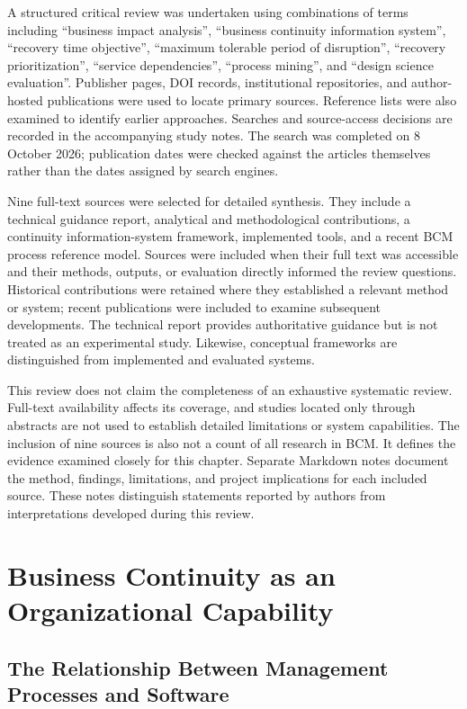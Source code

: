 A structured critical review was undertaken using combinations of terms including ``business impact analysis'', ``business continuity information system'', ``recovery time objective'', ``maximum tolerable period of disruption'', ``recovery prioritization'', ``service dependencies'', ``process mining'', and ``design science evaluation''. Publisher pages, DOI records, institutional repositories, and author-hosted publications were used to locate primary sources. Reference lists were also examined to identify earlier approaches. Searches and source-access decisions are recorded in the accompanying study notes. The search was completed on 8 October 2026; publication dates were checked against the articles themselves rather than the dates assigned by search engines.

Nine full-text sources were selected for detailed synthesis. They include a technical guidance report, analytical and methodological contributions, a continuity information-system framework, implemented tools, and a recent BCM process reference model. Sources were included when their full text was accessible and their methods, outputs, or evaluation directly informed the review questions. Historical contributions were retained where they established a relevant method or system; recent publications were included to examine subsequent developments. The technical report provides authoritative guidance but is not treated as an experimental study. Likewise, conceptual frameworks are distinguished from implemented and evaluated systems.

This review does not claim the completeness of an exhaustive systematic review. Full-text availability affects its coverage, and studies located only through abstracts are not used to establish detailed limitations or system capabilities. The inclusion of nine sources is also not a count of all research in BCM. It defines the evidence examined closely for this chapter. Separate Markdown notes document the method, findings, limitations, and project implications for each included source. These notes distinguish statements reported by authors from interpretations developed during this review.

\section{Business Continuity as an Organizational Capability}

\subsection{The Relationship Between Management Processes and Software}

